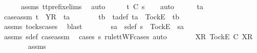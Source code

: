 \ \ \ \ \isamarkupfalse%
\ assms{\isacharparenleft}{}{\isacharparenright}\ tt{\isacharunderscore}prefix{\isachardot}elims{\isacharparenleft}{}{\isacharparenright}\ \isamarkupfalse%
\ auto\isanewline
\ \ \isamarkupfalse%
\ \isamarkupfalse%
\ {\isachardoublequoteopen}t\ {\isasymle}\isactrlsub C\ s{}{\isacharprime}{\isachardoublequoteclose}\isanewline
\ \ \isamarkupfalse%
\ auto\isanewline
\ \ \ \ \isamarkupfalse%
\ ta\isanewline
\ \ \ \ \isamarkupfalse%
\ case{\isacharunderscore}assm{\isacharcolon}\ {\isachardoublequoteopen}t\ {\isacharequal}\ {\isacharbrackleft}Y{\isacharbrackright}\isactrlsub R\ {\isacharhash}\ ta{\isachardoublequoteclose}\isanewline
\ \ \ \ \isamarkupfalse%
\ \isamarkupfalse%
\ tb\ \ ta{\isacharunderscore}def{\isacharcolon}\ {\isachardoublequoteopen}ta\ {\isacharequal}\ {\isacharbrackleft}Tock{\isacharbrackright}\isactrlsub E\ {\isacharhash}\ tb{\isachardoublequoteclose}\isanewline
\ \ \ \ \ \ \isamarkupfalse%
\ assms{\isacharparenleft}{}{\isacharparenright}\ tocks{\isachardot}cases\ \isamarkupfalse%
\ blast\isanewline
\ \ \ \ \isamarkupfalse%
\ \isamarkupfalse%
\ s{}a\ \ s{}{\isacharunderscore}def{\isacharcolon}\ {\isachardoublequoteopen}s{}\ {\isacharequal}\ {\isacharbrackleft}Tock{\isacharbrackright}\isactrlsub E\ {\isacharhash}\ s{}a{\isachardoublequoteclose}\isanewline
\ \ \ \ \ \ \isamarkupfalse%
\ assms{\isacharparenleft}{}{\isacharparenright}\ s{}{\isacharprime}{\isacharunderscore}def\ case{\isacharunderscore}assm\ \isamarkupfalse%
\ {\isacharparenleft}cases\ s{}\ rule{\isacharcolon}ttWF{\isachardot}cases{\isacharcomma}\ auto{\isacharparenright}\isanewline
\ \ \ \ \isamarkupfalse%
\ \isamarkupfalse%
\ {\isachardoublequoteopen}{\isacharbrackleft}{\isacharbrackleft}X{\isacharbrackright}\isactrlsub R{\isacharcomma}\ {\isacharbrackleft}Tock{\isacharbrackright}\isactrlsub E{\isacharbrackright}\ {\isasymle}\isactrlsub C\ {\isacharbrackleft}{\isacharbrackleft}X{\isacharbrackright}\isactrlsub R{\isacharbrackright}{\isachardoublequoteclose}\isanewline
\ \ \ \ \ \ \isamarkupfalse%
\ assms{\isacharparenleft}{}{\isacharparenright}\ \isamarkupfalse%
